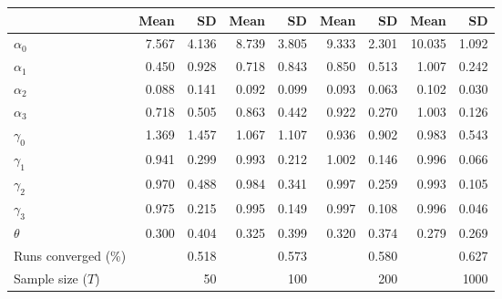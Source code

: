 
\begin{tabular}[t]{lrrrrrrrr}
\toprule
  & Mean & SD & Mean  & SD  & Mean   & SD   & Mean    & SD   \\
\midrule
$\alpha_{0}$ & 7.567 & 4.136 & 8.739 & 3.805 & 9.333 & 2.301 & 10.035 & 1.092\\
$\alpha_{1}$ & 0.450 & 0.928 & 0.718 & 0.843 & 0.850 & 0.513 & 1.007 & 0.242\\
$\alpha_{2}$ & 0.088 & 0.141 & 0.092 & 0.099 & 0.093 & 0.063 & 0.102 & 0.030\\
$\alpha_{3}$ & 0.718 & 0.505 & 0.863 & 0.442 & 0.922 & 0.270 & 1.003 & 0.126\\
$\gamma_{0}$ & 1.369 & 1.457 & 1.067 & 1.107 & 0.936 & 0.902 & 0.983 & 0.543\\
$\gamma_{1}$ & 0.941 & 0.299 & 0.993 & 0.212 & 1.002 & 0.146 & 0.996 & 0.066\\
$\gamma_{2}$ & 0.970 & 0.488 & 0.984 & 0.341 & 0.997 & 0.259 & 0.993 & 0.105\\
$\gamma_{3}$ & 0.975 & 0.215 & 0.995 & 0.149 & 0.997 & 0.108 & 0.996 & 0.046\\
$\theta$ & 0.300 & 0.404 & 0.325 & 0.399 & 0.320 & 0.374 & 0.279 & 0.269\\
Runs converged (\%) &  & 0.518 &  & 0.573 &  & 0.580 &  & 0.627\\
Sample size ($T$) &  & 50 &  & 100 &  & 200 &  & 1000\\
\bottomrule
\end{tabular}

